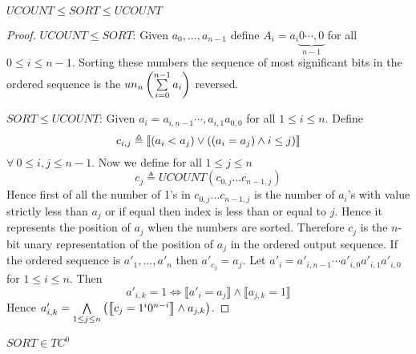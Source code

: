 \begin{theorem}
	$UCOUNT\leq SORT\leq UCOUNT$
\end{theorem}
\begin{proof} $UCOUNT\leq SORT$: 	Given $a_0,\dots, a_{n-1}$ define $A_i=a_i\underbrace{0\cdots,0}_{n-1}$ for all $0\leq i\leq n-1$. Sorting these numbers the sequence of most significant bits in the ordered sequence is the $un_n\left( \sum\limits_{i=0}^{n-1}a_i\right)$ reversed.

$SORT\leq UCOUNT$: Given $a_i=a_{i,n-1}\cdots, a_{i,1}a_{0,0}$ for all $1\leq i\leq n$.  Define $$c_{i,j}\triangleq\left\llbracket(a_i<a_j)\vee ((a_i=a_j)\wedge i\leq j)\right\rrbracket$$ $\forall\ 0\leq i,j\leq n-1$. Now we define for all $1\leq j\leq n$ $$c_j\triangleq UCOUNT(c_{0,j}\dots c_{n-1,j})$$Hence first of all the number of 1's in $c_{0,j}\dots c_{n-1,j}$ is the number of $a_i$'s with value strictly less than $a_j$ or if equal then index is less than or equal to $j$. Hence it represents the position of $a_j$ when the numbers are sorted. Therefore $c_j$ is the $n$-bit unary representation of the position of $a_j$ in the ordered output sequence. If the ordered sequence is $a'_{1}, \dots, a'_{n}$ then $a'_{c_j}=a_j$. Let $a'_i=a'_{i,n-1}\cdots a'_{i,0}a'_{i,1}a'_{i,0}$ for $1\leq i\leq n$. Then $$a'_{i,k}=1\iff \llbracket a'_{i}=a_j\rrbracket \wedge \llbracket a_{j,k}=1\rrbracket$$ Hence $a'_{i,k}=\bigwedge\limits_{1\leq j\leq n}\left(\left\llbracket c_j=1^i0^{n-i}\right\rrbracket \wedge a_{j,k}  \right)$.
\end{proof}

\begin{corollary}
	$SORT\in TC^0$
\end{corollary}


